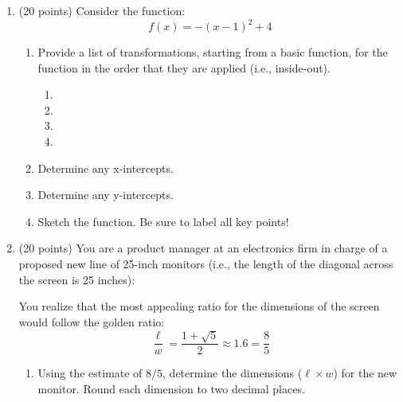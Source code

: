 \documentclass[letterpaper,12pt,fleqn]{article}
\begin{document}
\begin{enumerate}
\newpage

\item (20 points) Consider the function:
\[f(x)=-(x-1)^2+4\]
\begin{enumerate}
\item Provide a list of transformations, starting from a basic function, for the
function in the order that they are applied (i.e., inside-out).
\begin{enumerate}
\item
\item
\item
\item
\end{enumerate}

\item Determine any x-intercepts.

\vspace{2in}

\item Determine any y-intercepts.

\vspace{1in}

\item Sketch the function. Be sure to label all key points!

\vspace{3in}
\end{enumerate}

\newpage

\item (20 points) You are a product manager at an electronics firm in charge of
a proposed new line of 25-inch monitors (i.e., the length of the diagonal
across the screen is 25 inches):

\bigskip

\begin{figure}[h]
\setlength{\leftskip}{1in}
\end{figure}

You realize that the most appealing ratio for the dimensions of the screen
would follow the golden ratio:
\[\frac{\ell}{w}=\frac{1+\sqrt{5}}{2}\approx1.6=\frac{8}{5}\]

\vspace{0.25in}

\begin{enumerate}
\item Using the estimate of $8/5$, determine the dimensions ($\ell\times w$)
for the new monitor. Round each dimension to two decimal places.


\end{enumerate}
\end{enumerate}
\end{document}

